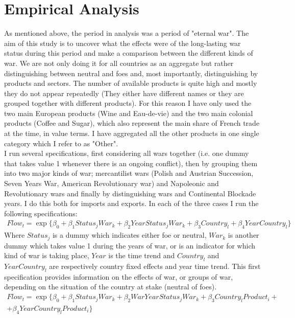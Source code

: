 \documentclass[12pt,a4paper,titlepage,english]{article}
\begin{document}
\section{Empirical Analysis}
As mentioned above, the period in analysis was a period of "eternal war". The aim of this study is to uncover what the effects were of the long-lasting war status during this period and make a comparison between the different kinds of war. We are not only doing it for all countries as an aggregate but rather distinguishing between neutral and foes and, most importantly, distinguishing by products and sectors. The number of available products is quite high and mostly they do not appear repeatedly (They either have different names or they are grouped together with different products). For this reason I have only used the two main European products (Wine and Eau-de-vie) and the two main colonial products (Coffee and Sugar), which also represent the main share of French trade at the time, in value terms. I have aggregated all the other products in one single category which I refer to as "Other". \\
I run several specifications, first considering all wars together (i.e. one dummy that takes value 1 whenever there is an ongoing conflict), then by grouping them into two major kinds of war; mercantilist wars (Polish and Austrian Succession, Seven Years War, American Revolutionary war) and Napoleonic and Revolutionary wars and finally by distinguishing wars and Continental Blockade years. I do this both for imports and exports. In each of the three cases I run the following specifications: 
\begin{multline}
Flow_{t}=\exp\{\beta_0+\beta_1Status_jWar_k + \beta_2YearStatus_jWar_k+\beta_3Country_l +\beta_4YearCountry_l\}
\end{multline}
Where $Status_j$ is a dummy which indicates either foe or neutral, $War_k$ is another dummy which takes value 1 during the years of war, or is an indicator for which kind of war is taking place, $Year$ is the time trend and $Country_l$ and $YearCountry_l$ are respectively country fixed effects and year time trend. This first specification provides information on the effects of war, or groups of war, depending on the situation of the country at stake (neutral of foes). 
\begin{multline}
Flow_{t}=\exp\{\beta_0+\beta_1Status_jWar_k + \beta_2WarYearStatus_jWar_k+\beta_3Country_lProduct_i +\\ +\beta_4YearCountry_lProduct_i\}
\end{multline}
\end{document}
